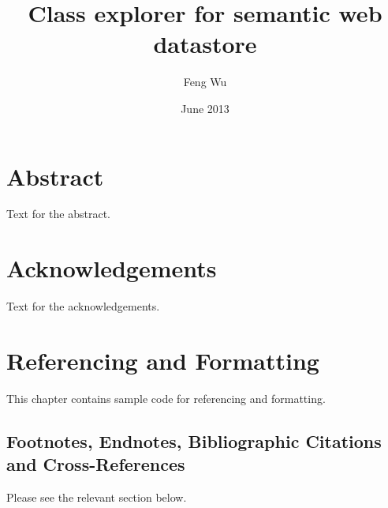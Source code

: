 \documentclass[12pt]{cls}
\title{Class explorer for semantic web datastore}
\author{Feng Wu}
\date{June 2013}
\begin{document}
\muntitlepage

\setcounter{secnumdepth}{3} \setcounter{tocdepth}{3}

 \setcounter{page}{1}

\doublespacing
\setlength{\topmargin}{-.5in}

\chapter*{Abstract}
Text for the abstract.

\chapter*{Acknowledgements}
Text for the acknowledgements.

\renewcommand{\contentsname}{Table of Contents}
\tableofcontents{}
\listoftables{}
\listoffigures{}

\doublespacing
\clearpage



\chapter{Referencing and Formatting}
\setcounter{secnumdepth}{3} 
\setcounter{page}{1} \pagestyle{myheadings}
\markboth{}{}\markright{} \rhead{\thepage} \setcounter{page}{1}
\pagestyle{myheadings}  \rhead{\thepage}
\setcounter{page}{1}

This chapter contains sample code for referencing and formatting.

\section{Footnotes, Endnotes, Bibliographic Citations and Cross-References}
Please see the relevant section below.
\end{document}
